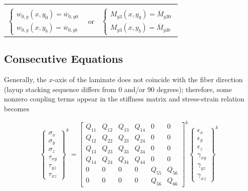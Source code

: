 \documentclass{article}
\begin{document}
\begin{table}
\begin{tabular}{lcl}
 & &  \\
$\left\{\begin{matrix} w_{0,y}(x, y_0) = \overline{w}_{0,y0}\\ w_{0,y}(x, y_b) = \overline{w}_{0,yb} \end{matrix}\right.$ & or & $\left\{\begin{matrix} M_{y3}(x, y_0) = \overline{M}_{y30}\\ M_{y3}(x, y_b) = \overline{M}_{y3b} \end{matrix}\right.$ 
\end{tabular}
\label{tab:bc}
\end{table}

\subsection{Consecutive Equations}
Generally, the $x$-axis of the laminate does not coincide with the fiber direction (layup stacking sequence differs from 0 and/or 90 degrees); therefore, some nonzero coupling terms appear in the stiffness matrix and stress-strain relation becomes \cite{Kassapoglou2015}

\begin{equation}
\begin{Bmatrix}
\sigma_x\\ 
\sigma_y\\ 
\sigma_z\\ 
\tau_{xy}\\ 
\tau_{yz}\\ 
\tau_{xz}
\end{Bmatrix}^k
=\begin{bmatrix}
Q_{11} & Q_{12} & Q_{13} & Q_{14} & 0 & 0 \\ 
Q_{12} & Q_{22} & Q_{23} & Q_{24} & 0 & 0 \\ 
Q_{13} & Q_{23} & Q_{33} & Q_{34} & 0 & 0 \\ 
Q_{14} & Q_{24} & Q_{34} & Q_{44} & 0 & 0 \\ 
0 & 0 & 0 & 0 & Q_{55} & Q_{56} \\ 
0 & 0 & 0 & 0 & Q_{56} & Q_{66}
\end{bmatrix}^k
\begin{Bmatrix}
\epsilon_x\\ 
\epsilon_y\\ 
\epsilon_z\\ 
\gamma_{xy}\\ 
\gamma_{yz}\\ 
\gamma_{xz}
\end{Bmatrix}^k
\label{eq:stress_strain}
\end{equation}
\end{document}
